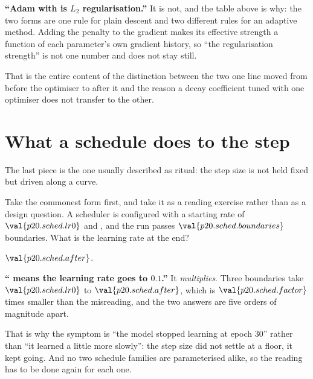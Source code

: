 \begin{fr}
\begin{trapbox}
\textbf{\enquote{Adam with  is $L_2$ regularisation.}} It
is not, and the table above is why: the two forms are one rule for plain
descent and two different rules for an adaptive method. Adding the penalty to
the gradient makes its effective strength a function of each parameter's own
gradient history, so \enquote{the regularisation strength} is not one number
and does not stay still.

That is the entire content of the distinction between the two \dash{} one
line moved from before the optimiser to after it \dash{} and the reason a
decay coefficient tuned with one optimiser does not transfer to the other.
\end{trapbox}
\end{fr}

\section{What a schedule does to the step}
\label{sec:P20-schedules}

\begin{fr}
The last piece is the one usually described as ritual: the step size is not
held fixed but driven along a curve.

Take the commonest form first, and take it as a reading exercise rather than
as a design question. A scheduler is configured with a starting rate of
$\val{p20.sched.lr0}$ and , and the run
passes $\val{p20.sched.boundaries}$ boundaries. What is the learning rate at
the end?
\dotline
\nextframe
\end{fr}

\begin{fr}
\begin{ansblock}
$\val{p20.sched.after}$.
\end{ansblock}

\begin{trapbox}
\textbf{\enquote{ means the learning rate goes to
$\num{0.1}$.}} It \emph{multiplies}. Three boundaries take
$\val{p20.sched.lr0}$ to $\val{p20.sched.after}$, which is
$\val{p20.sched.factor}$ times smaller than the misreading, and the two
answers are five orders of magnitude apart.

That is why the symptom is \enquote{the model stopped learning at epoch
$30$} rather than \enquote{it learned a little more slowly}: the step size did
not settle at a floor, it kept going. And no two schedule families are
parameterised alike, so the reading has to be done again for each one.
\end{trapbox}
\end{fr}

